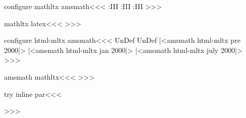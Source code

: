 {{\<configure mathltx amsmath\><<<
   {\abovewithdelims:III}
   {}
\def\abovewithdelims:III#1#2#3{%
   \def\:temp{#2#3}\def\:tempa{..}\ifx \:temp\:tempa
      \Send{GROUP}{0}{<mfra-13 linethickness="\the\tmp:dim"><mrow>}%
      \HCode{</mrow>}\o:@@over:
      \HCode{<mrow>}\Send{EndGROUP}{0}{</mrow></mfrac>}
   \else
      \Send{GROUP}{0}{\l:brace}%
      \HCode{\string\abovewithdelims
          |<lr del 2|>|<lr del 3|>\the\tmp:dim\space}\o:@@over:
      \Send{EndGROUP}{0}{\r:brace}%
   \fi  
   \tmp:dim
 }
   {\atopwithdelims:III}
   {}
\def\atopwithdelims:III#1#2#3{%
   \def\:temp{#2#3}\def\:tempa{..}\ifx \:temp\:tempa
      \Send{GROUP}{0}{<mfrac-14 linethickness="0"><mrow>}%
      \HCode{</mrow>}\o:@@atop:
      \HCode{<mrow>}\Send{EndGROUP}{0}{</mrow></mfrac>}
   \else
      \Send{GROUP}{0}{<mfenced-6 separators=""\Hnewline
          open="|<lr del 2|>" close="|<lr del 3|>"><mfrac-1
          linethickness="0"><mrow>}%
      \HCode{</mrow>}\o:@@atop:
      \HCode{<mrow>}\Send{EndGROUP}{0}{</\a:mathltx
                               mrow></mfrac></mfenced>}
   \fi
 }
   {\overwithdelims:III}
   {}
\def\overwithdelims:III#1#2#3{%
   \def\:temp{#2#3}\def\:tempa{..}\ifx \:temp\:tempa
      \Send{GROUP}{0}{<mfrac-2><mrow>}%
      \HCode{</mrow>}\o:@@over:
      \HCode{<mrow>}\Send{EndGROUP}{0}{</mrow></mfrac>}
   \else
      \Send{GROUP}{0}{\l:brace}%
      \HCode{\string\overwithdelims
          |<lr del 2|>|<lr del 3|>}\o:@@over:
      \Send{EndGROUP}{0}{\r:brace}%
   \fi
 }
>>>



\<mathltx latex\><<<
   {}
   {}
   {}
   {}
>>>



\<configure html-mltx amsmath\><<<
\ifx \mathdisplay@@pop\:UnDef
   \ifx \emdf@La\:UnDef
      |<amsmath html-mltx pre 2000|>
   \else
      |<amsmath html-mltx jan 2000|>
   \fi
\else
   |<amsmath html-mltx july 2000|>
\fi
>>>



\<amsmath mathltx\><<<
   {\HCode{\string\tmspace{\textspace}}}
>>>





\<try inline par\><<<
\ShowPar\par{\HCondtrue\noindent}%
>>>




}}
